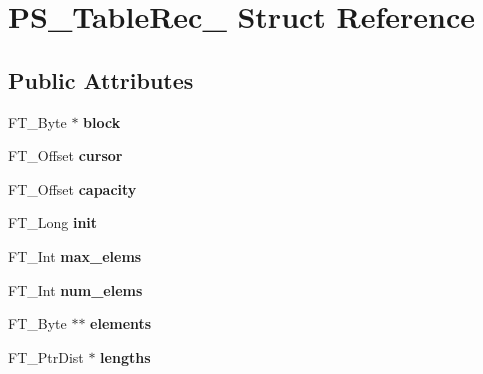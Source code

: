 \hypertarget{struct_p_s___table_rec__}{}\section{P\+S\+\_\+\+Table\+Rec\+\_\+ Struct Reference}
\label{struct_p_s___table_rec__}
\subsection*{Public Attributes}
\begin{DoxyCompactItemize}
\item 
F\+T\+\_\+\+Byte $\ast$ {\bfseries block}\hypertarget{struct_p_s___table_rec___a6caa7b6aef2ba7e28d260b6a87782723}{}\label{struct_p_s___table_rec___a6caa7b6aef2ba7e28d260b6a87782723}

\item 
F\+T\+\_\+\+Offset {\bfseries cursor}\hypertarget{struct_p_s___table_rec___a8725d30f75b6dc785b988ed689ac7e58}{}\label{struct_p_s___table_rec___a8725d30f75b6dc785b988ed689ac7e58}

\item 
F\+T\+\_\+\+Offset {\bfseries capacity}\hypertarget{struct_p_s___table_rec___acf6d4f15ca247960cc7823b73d3c66bf}{}\label{struct_p_s___table_rec___acf6d4f15ca247960cc7823b73d3c66bf}

\item 
F\+T\+\_\+\+Long {\bfseries init}\hypertarget{struct_p_s___table_rec___aa76fb2bcdcf4fc75e880b092bb9d3115}{}\label{struct_p_s___table_rec___aa76fb2bcdcf4fc75e880b092bb9d3115}

\item 
F\+T\+\_\+\+Int {\bfseries max\+\_\+elems}\hypertarget{struct_p_s___table_rec___a8594ec199ad792ed7ffd558806a7d23b}{}\label{struct_p_s___table_rec___a8594ec199ad792ed7ffd558806a7d23b}

\item 
F\+T\+\_\+\+Int {\bfseries num\+\_\+elems}\hypertarget{struct_p_s___table_rec___a26706016251497b19039f2c002c4e9d5}{}\label{struct_p_s___table_rec___a26706016251497b19039f2c002c4e9d5}

\item 
F\+T\+\_\+\+Byte $\ast$$\ast$ {\bfseries elements}\hypertarget{struct_p_s___table_rec___a1967f81d98ea65a605968a7e1e5c51c3}{}\label{struct_p_s___table_rec___a1967f81d98ea65a605968a7e1e5c51c3}

\item 
F\+T\+\_\+\+Ptr\+Dist $\ast$ {\bfseries lengths}\hypertarget{struct_p_s___table_rec___a955ae6315b89923f1074f3d046da23b1}{}\label{struct_p_s___table_rec___a955ae6315b89923f1074f3d046da23b1}


\end{DoxyCompactItemize}
